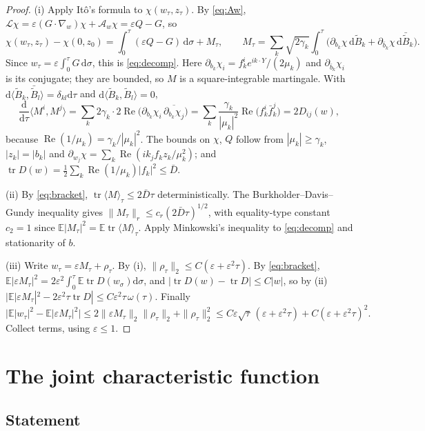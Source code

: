 \documentclass[11pt]{article}
\newcommand{\dd}{\mathrm{d}}
\newcommand{\E}{\mathbb{E}}
\newcommand{\eps}{\varepsilon}
\newcommand{\cL}{\mathcal{L}}
\newcommand{\cA}{\mathcal{A}}
\renewcommand{\Re}{\operatorname{Re}}
\newcommand{\nrm}[2]{\|#1\|_{#2}}
\newcommand{\tr}{\operatorname{tr}}
\theoremstyle{remark}
\begin{document}
\begin{proof}
(i) Apply It\^o's formula to $\chi(w_\tau,z_\tau)$. By \eqref{eq:Aw},
$\cL\chi = \eps(G\cdot\nabla_w)\chi + \cA_w\chi = \eps Q - G$, so
\[
  \chi(w_\tau,z_\tau) - \chi(0,z_0)
  = \int_0^\tau(\eps Q - G)\,\dd\sigma + M_\tau,\qquad
  M_\tau = \sum_k\sqrt{2\gamma_k}\int_0^\tau\bigl(
    \partial_{b_k}\chi\,\dd\tilde B_k + \partial_{\bar b_k}\chi\,\dd\bar{\tilde B}_k\bigr).
\]
Since $w_\tau = \eps\int_0^\tau G\,\dd\sigma$, this is \eqref{eq:decomp}.
Here $\partial_{b_k}\chi_i = f_k^ie^{ik\cdot Y}/(2\mu_k)$ and
$\partial_{\bar b_k}\chi_i$ is its conjugate; they are bounded, so $M$ is a
square-integrable martingale. With
$\dd\langle\tilde B_k,\bar{\tilde B}_l\rangle = \delta_{kl}\dd\tau$ and
$\dd\langle\tilde B_k,\tilde B_l\rangle = 0$,
\[
  \frac{\dd}{\dd\tau}\langle M^i,M^j\rangle
  = \sum_k2\gamma_k\cdot2\Re\bigl(\partial_{b_k}\chi_i\,\overline{\partial_{b_k}\chi_j}\bigr)
  = \sum_k\frac{\gamma_k}{|\mu_k|^2}\Re\bigl(f_k^i\bar f_k^j\bigr)
  = 2D_{ij}(w),
\]
because $\Re(1/\mu_k) = \gamma_k/|\mu_k|^2$. The bounds on $\chi$, $Q$ follow
from $|\mu_k|\ge\gamma_k$, $|z_k| = |b_k|$ and
$\partial_{w_j}\chi = \sum_k\Re(ik_jf_kz_k/\mu_k^2)$; and
$\tr D(w) = \frac12\sum_k\Re(1/\mu_k)|f_k|^2\le\bar D$.

(ii) By \eqref{eq:bracket}, $\tr\langle M\rangle_\tau\le2\bar D\tau$
deterministically. The Burkholder--Davis--Gundy inequality gives
$\nrm{M_\tau}{r}\le c_r(2\bar D\tau)^{1/2}$, with equality-type constant
$c_2 = 1$ since $\E|M_\tau|^2 = \E\tr\langle M\rangle_\tau$. Apply Minkowski's
inequality to \eqref{eq:decomp} and stationarity of $b$.

(iii) Write $w_\tau = \eps M_\tau + \rho_\tau$. By (i),
$\nrm{\rho_\tau}{2}\le C(\eps+\eps^2\tau)$. By \eqref{eq:bracket},
$\E|\eps M_\tau|^2 = 2\eps^2\int_0^\tau\E\tr D(w_\sigma)\dd\sigma$, and
$|\tr D(w)-\tr D|\le C|w|$, so by (ii)
$|\E|\eps M_\tau|^2 - 2\eps^2\tau\tr D|\le C\eps^2\tau\,\omega(\tau)$. Finally
\[
  \bigl|\E|w_\tau|^2 - \E|\eps M_\tau|^2\bigr|
  \le2\nrm{\eps M_\tau}{2}\nrm{\rho_\tau}{2} + \nrm{\rho_\tau}{2}^2
  \le C\eps\sqrt\tau\,(\eps+\eps^2\tau) + C(\eps+\eps^2\tau)^2 .
\]
Collect terms, using $\eps\le1$.
\end{proof}

\section{The joint characteristic function}

\subsection{Statement}
\end{document}
